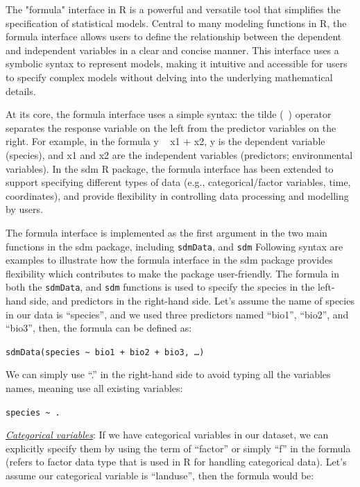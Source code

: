\documentclass[
]{article}
\begin{document}
\begin{mdframed}[backgroundcolor=gray!10, linecolor=black!75, linewidth=2pt, roundcorner=5pt, shadow=true,frametitle={\textbf{BOX 1: \uline{Formula interface in the sdmData function}}}]

The "formula" interface in R is a powerful and versatile tool that simplifies the specification of statistical models. Central to many modeling functions in R, the formula interface allows users to define the relationship between the dependent and independent variables in a clear and concise manner. This interface uses a symbolic syntax to represent models, making it intuitive and accessible for users to specify complex models without delving into the underlying mathematical details.

At its core, the formula interface uses a simple syntax: the tilde (~) operator separates the response variable on the left from the predictor variables on the right. For example, in the formula y ~ x1 + x2, y is the dependent variable (species), and x1 and x2 are the independent variables (predictors; environmental variables). In the sdm R package, the formula interface has been extended to support specifying different types of data (e.g., categorical/factor variables, time, coordinates), and provide flexibility in controlling data processing and modelling by users. 

The formula interface is implemented as the first argument in the two main functions in the sdm package, including \texttt{sdmData}, and \texttt{sdm} Following syntax are examples to illustrate how the formula interface in the sdm package provides flexibility which contributes to make the package user-friendly.
The formula in both the  \texttt{sdmData}, and \texttt{sdm} functions is used to specify the species in the left-hand side, and predictors in the right-hand side. Let’s assume the name of species in our data is “species”, and we used three predictors named “bio1”, “bio2”, and “bio3”, then, the formula can be defined as:

\texttt{sdmData(species \textasciitilde{} bio1 + bio2 + bio3, …)}

We can simply use “.” in the right-hand side to avoid typing all the variables names, meaning use all existing variables:


\texttt{species \textasciitilde{} .}


\uline{\textit{Categorical variables}}: If we have categorical variables in our dataset, we can explicitly specify them by using the term of “factor” or simply “f” in the formula (refers to factor data type that is used in R for handling categorical data). Let’s assume our categorical variable is “landuse”, then the formula would be:



\end{mdframed}
\end{document}
